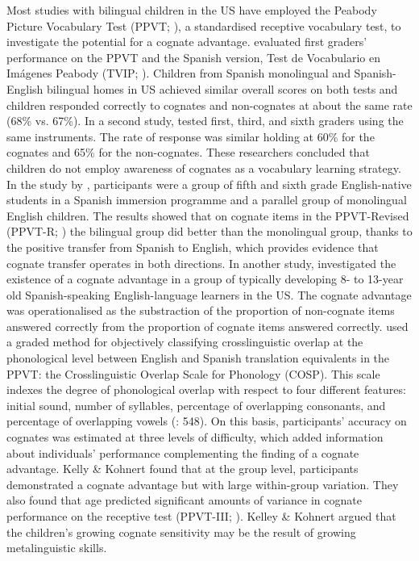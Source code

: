 \documentclass[output=paper,modfonts,nonflat,newtxmath]{langsci/langscibook}
\begin{document}
Most studies with bilingual children in the US have employed the Peabody Picture Vocabulary Test (PPVT; \citealt{DunnDunn1981, DunnDunn1997}), a standardised receptive vocabulary test, to investigate the potential for a cognate advantage. \citet{UmbelEtAl1992} evaluated first graders’ performance on the PPVT and the Spanish version, Test de Vocabulario en Imágenes Peabody (TVIP; \citealt{DunnEtAl1986}). Children from Spanish monolingual and Spanish-English bilingual homes in US achieved similar overall scores on both tests and children responded correctly to cognates and non-cognates at about the same rate (68\% vs. 67\%). In a second study, \citet{UmbelOller1994} tested first, third, and sixth graders using the same instruments. The rate of response was similar holding at 60\% for the cognates and 65\% for the non-cognates. These researchers concluded that children do not employ awareness of cognates as a vocabulary learning strategy. In the study by \citet{CunninghamGraham2000}, participants were a group of fifth and sixth grade English-native students in a Spanish immersion programme and a parallel group of monolingual English children. The results showed that on cognate items in the PPVT-Revised (PPVT-R; \citealt{DunnDunn1981}) the bilingual group did better than the monolingual group, thanks to the positive transfer from Spanish to English, which provides evidence that cognate transfer operates in both directions. In another study, \citet{KelleyKohnert2012} investigated the existence of a cognate advantage in a group of typically developing 8- to 13-year old Spanish-speaking English-language learners in the US. The cognate advantage was operationalised as the substraction of the proportion of non-cognate items answered correctly from the proportion of cognate items answered correctly. \citealt{KelleyKohnert2012} used a graded method for objectively classifying crosslinguistic overlap at the phonological level between English and Spanish translation equivalents in the PPVT: the Crosslinguistic Overlap Scale for Phonology (COSP). This scale indexes the degree of phonological overlap with respect to four different features: initial sound, number of syllables, percentage of overlapping consonants, and percentage of overlapping vowels (\citealt{KohnertEtAl2004}: 548). On this basis, participants’ accuracy on cognates was estimated at three levels of difficulty, which added information about individuals’ performance complementing the finding of a cognate advantage. Kelly \& Kohnert found that at the group level, participants demonstrated a cognate advantage but with large within-group variation. They also found that age predicted significant amounts of variance in cognate performance on the receptive test (PPVT-III; \citealt{DunnDunn1997}). Kelley \& Kohnert argued that the children’s growing cognate sensitivity may be the result of growing metalinguistic skills.
\end{document}
